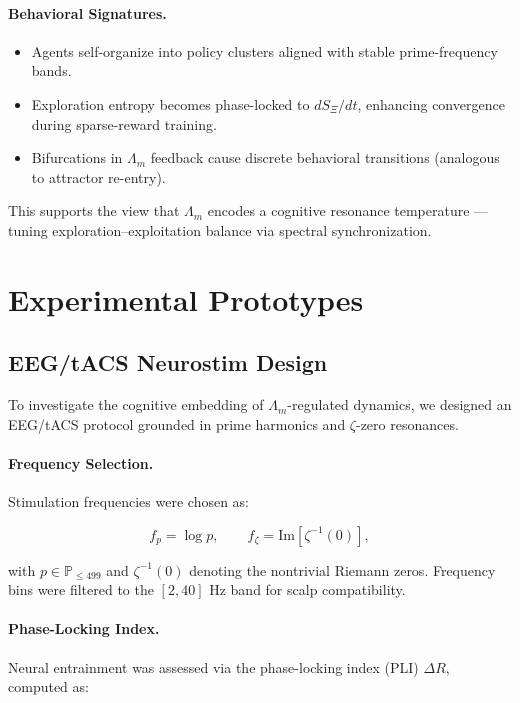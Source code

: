 \documentclass[12pt]{article}
\theoremstyle{plain}
\begin{document}
\paragraph{Behavioral Signatures.}
\begin{itemize}
    \item Agents self-organize into policy clusters aligned with stable prime-frequency bands.
    \item Exploration entropy becomes phase-locked to $dS_\Xi/dt$, enhancing convergence during sparse-reward training.
    \item Bifurcations in $\Lambda_m$ feedback cause discrete behavioral transitions (analogous to attractor re-entry).
\end{itemize}

This supports the view that $\Lambda_m$ encodes a cognitive resonance temperature — tuning exploration–exploitation balance via spectral synchronization.

\section{Experimental Prototypes}

\subsection{EEG/tACS Neurostim Design}

To investigate the cognitive embedding of $\Lambda_m$-regulated dynamics, we designed an EEG/tACS protocol grounded in prime harmonics and $\zeta$-zero resonances.

\paragraph{Frequency Selection.} Stimulation frequencies were chosen as:

\begin{equation}
f_p = \log p, \qquad f_\zeta = \text{Im}[\zeta^{-1}(0)],
\end{equation}

with $p \in \mathbb{P}_{\leq 499}$ and $\zeta^{-1}(0)$ denoting the nontrivial Riemann zeros. Frequency bins were filtered to the $[2, 40]$ Hz band for scalp compatibility.

\paragraph{Phase-Locking Index.} Neural entrainment was assessed via the phase-locking index (PLI) $\Delta R$, computed as:
\end{document}
